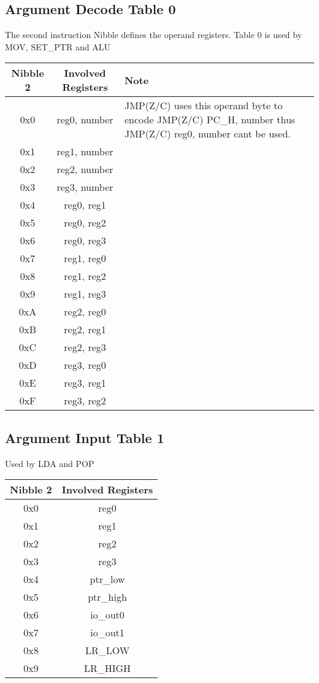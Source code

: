 \documentclass[a4paper, 12pt]{article}
\begin{document}
	\subsection{Argument Decode Table 0}
	The second instruction Nibble defines the operand registers.
	Table 0 is used by MOV, SET\_PTR and ALU
	\begin{center}
		\begin{tabular}{|c|c|p{6cm}|}
			\hline
			Nibble 2 & Involved Registers & Note \\ \hline
			0x0 & reg0, number & JMP(Z/C) uses this operand byte to encode JMP(Z/C) PC\_H, number thus JMP(Z/C) reg0, number cant be used. \\ \hline
			0x1 & reg1, number & \\ \hline
			0x2 & reg2, number & \\ \hline
			0x3 & reg3, number & \\ \hline
			0x4 & reg0, reg1 & \\ \hline
			0x5 & reg0, reg2 & \\ \hline
			0x6 & reg0, reg3 & \\ \hline
			0x7 & reg1, reg0 & \\ \hline
			0x8 & reg1, reg2 & \\ \hline
			0x9 & reg1, reg3 & \\ \hline
			0xA & reg2, reg0 & \\ \hline
			0xB & reg2, reg1 & \\ \hline
			0xC & reg2, reg3 & \\ \hline
			0xD & reg3, reg0 & \\ \hline
			0xE & reg3, reg1 & \\ \hline
			0xF & reg3, reg2 & \\ \hline
		\end{tabular}
	\end{center}	
	\newpage
	\subsection{Argument Input Table 1}
	Used by LDA and POP
	\begin{center}
		\begin{tabular}{|c|c|}
			\hline
			Nibble 2 & Involved Registers \\ \hline
			0x0 & reg0 \\ \hline
			0x1 & reg1 \\ \hline
			0x2 & reg2 \\ \hline
			0x3 & reg3 \\ \hline
			0x4 & ptr\_low\\ \hline
			0x5 & ptr\_high \\ \hline
			0x6 & io\_out0 \\ \hline
			0x7 & io\_out1 \\ \hline
			0x8 & LR\_LOW \\ \hline
			0x9 & LR\_HIGH \\ \hline
		\end{tabular}
	\end{center}	
\end{document}
